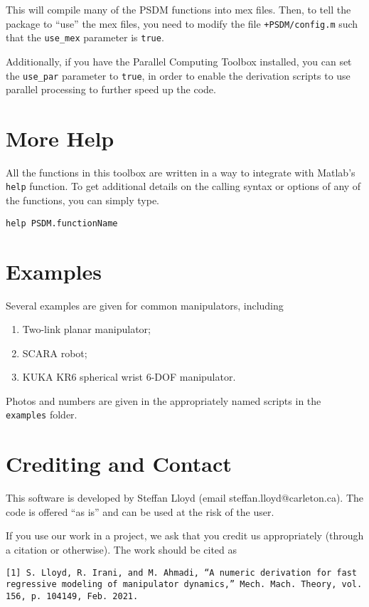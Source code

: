 \documentclass[12pt]{article}
\begin{document}
This will compile many of the PSDM functions into mex files. Then, to tell the package to ``use'' the mex files, you need to modify the file \texttt{+PSDM/config.m} such that the \texttt{use\_mex} parameter is \texttt{true}.

Additionally, if you have the Parallel Computing Toolbox installed, you can set the \texttt{use\_par} parameter to \texttt{true}, in order to enable the derivation scripts to use parallel processing to further speed up the code.

\section{More Help}

All the functions in this toolbox are written in a way to integrate with Matlab's \texttt{help} function. To get additional details on the calling syntax or options of any of the functions, you can simply type.
\begin{lstlisting}
help PSDM.functionName
\end{lstlisting}

\section{Examples}

Several examples are given for common manipulators, including
\begin{enumerate}[nosep]
	\item Two-link planar manipulator;
	\item SCARA robot;
	\item KUKA KR6 spherical wrist 6-DOF manipulator.
\end{enumerate}
Photos and numbers are given in the appropriately named scripts in the \texttt{examples} folder.

\section{Crediting and Contact}

This software is developed by Steffan Lloyd (email steffan.lloyd@carleton.ca). The code is offered ``as is'' and can be used at the risk of the user.

If you use our work in a project, we ask that you credit us appropriately (through a citation or otherwise). The work should be cited as \cite{Lloyd2021}

\texttt{[1] S. Lloyd, R. Irani, and M. Ahmadi, ``A numeric derivation for fast regressive modeling of manipulator dynamics,'' Mech. Mach. Theory, vol. 156, p. 104149, Feb. 2021.}
\end{document}
